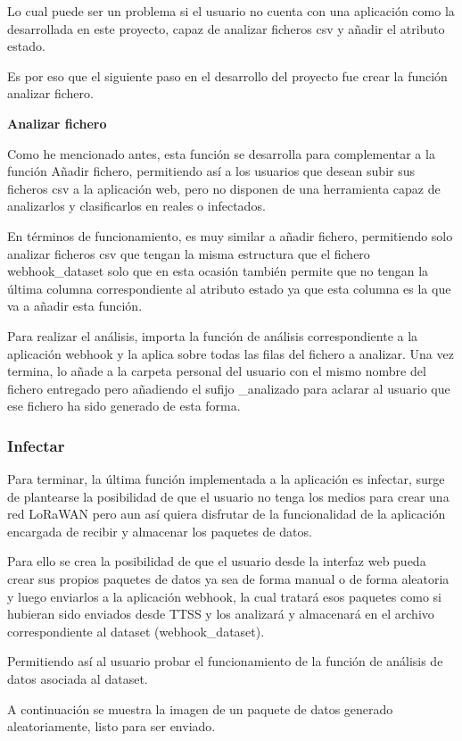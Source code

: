 Lo cual puede ser un problema si el usuario no cuenta con una aplicación como la desarrollada en este proyecto, capaz de analizar ficheros csv y añadir el atributo estado.

Es por eso que el siguiente paso en el desarrollo del proyecto fue crear la función analizar fichero.


\textbf{Analizar fichero}

Como he mencionado antes, esta función se desarrolla para complementar a la función Añadir fichero, permitiendo así a los usuarios que desean subir sus ficheros csv a la aplicación web, pero no disponen de una herramienta capaz de analizarlos y clasificarlos en reales o infectados.

En términos de funcionamiento, es muy similar a añadir fichero, permitiendo solo analizar ficheros csv que tengan la misma estructura que el fichero webhook\_dataset solo que en esta ocasión también permite que no tengan la última columna correspondiente al atributo estado ya que esta columna es la que va a añadir esta función.

Para realizar el análisis, importa la función de análisis correspondiente a la aplicación webhook y la aplica sobre todas las filas del fichero a analizar. Una vez termina, lo añade a la carpeta personal del usuario con el mismo nombre del fichero entregado pero añadiendo el sufijo \_analizado para aclarar al usuario que ese fichero ha sido generado de esta forma.


\subsubsection{Infectar}

Para terminar, la última función implementada a la aplicación es infectar, surge de plantearse la posibilidad de que el usuario no tenga los medios para crear una red LoRaWAN pero aun así quiera disfrutar de la funcionalidad de la aplicación encargada de recibir y almacenar los paquetes de datos.

Para ello se crea la posibilidad de que el usuario desde la interfaz web pueda crear sus propios paquetes de datos ya sea de forma manual o de forma aleatoria y luego enviarlos a la aplicación webhook, la cual tratará esos paquetes como si hubieran sido enviados desde TTSS y los analizará y almacenará en el archivo correspondiente al dataset (webhook\_dataset).

Permitiendo así al usuario probar el funcionamiento de la función de análisis de datos asociada al dataset.

A continuación se muestra la imagen de un paquete de datos generado aleatoriamente, listo para ser enviado.

